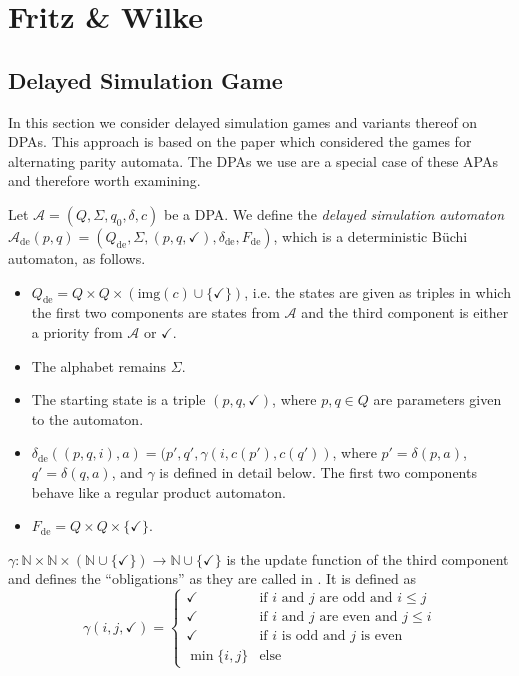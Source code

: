 
\section{Fritz \& Wilke}

\subsection{Delayed Simulation Game}
In this section we consider delayed simulation games and variants thereof on DPAs. This approach is based on the paper \cite{} which considered the games for alternating parity automata. The DPAs we use are a special case of these APAs and therefore worth examining.

\begin{defn}
	Let $\mathcal{A} = (Q, \Sigma, q_0, \delta, c)$ be a DPA. We define the \emph{delayed simulation automaton} $\mathcal{A}_\text{de}(p, q) = (Q_\text{de}, \Sigma, (p, q, \checkmark), \delta_\text{de}, F_\text{de})$, which is a deterministic Büchi automaton, as follows.
	
	\begin{itemize}
		\item $Q_\text{de} = Q \times Q \times (\text{img}(c) \cup \{ \checkmark \})$, i.e. the states are given as triples in which the first two components are states from $\mathcal{A}$ and the third component is either a priority from $\mathcal{A}$ or $\checkmark$.
		\item The alphabet remains $\Sigma$.
		\item The starting state is a triple $(p, q, \checkmark)$, where $p, q \in Q$ are parameters given to the automaton.
		\item $\delta_\text{de}( (p, q, i), a ) = ( p', q', \gamma(i, c(p'), c(q'))$, where $p' = \delta(p, a)$, $q' = \delta(q, a)$, and $\gamma$ is defined in detail below. The first two components behave like a regular product automaton.
		\item $F_\text{de} = Q \times Q \times \{ \checkmark \}$.
	\end{itemize}
	
	$\gamma : \mathbb{N} \times \mathbb{N} \times (\mathbb{N} \cup \{\checkmark\}) \rightarrow \mathbb{N} \cup \{\checkmark\}$ is the update function of the third component and defines the \enquote{obligations} as they are called in \cite{}. It is defined as 
	$$ \gamma(i, j, \checkmark) = \begin{cases}
		\checkmark & \text{if } i \text{ and } j \text{ are odd and } i \leq j \\
		\checkmark & \text{if } i \text{ and } j \text{ are even and } j \leq i \\
		\checkmark & \text{if } i \text{ is odd and } j \text{ is even} \\
		\min \{ i,j \} & \text{else}
	\end{cases} $$	
	

\end{defn}
